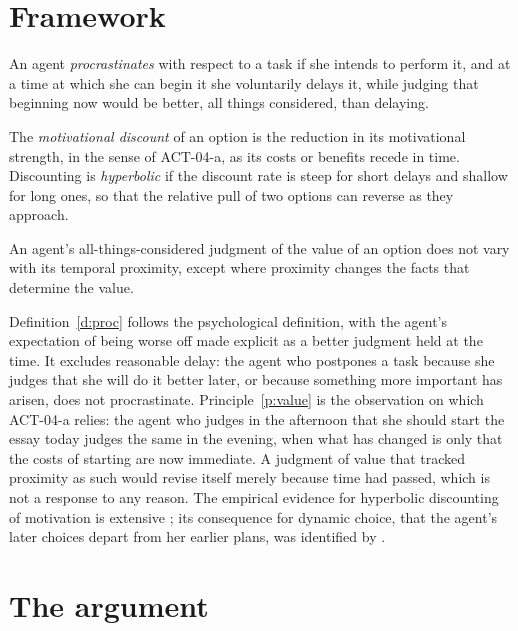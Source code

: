 \documentclass{situationist-preprint}
\begin{document}
\section{Framework}

\begin{definition}[Procrastination]\label{d:proc}
An agent \emph{procrastinates} with respect to a task if she intends to perform it, and at a time at which she can begin it she voluntarily delays it, while judging that beginning now would be better, all things considered, than delaying.
\end{definition}

\begin{definition}[Discounting]\label{d:disc}
The \emph{motivational discount} of an option is the reduction in its motivational strength, in the sense of ACT-04-a, as its costs or benefits recede in time. Discounting is \emph{hyperbolic} if the discount rate is steep for short delays and shallow for long ones, so that the relative pull of two options can reverse as they approach.
\end{definition}

\begin{principle}\label{p:value}
An agent's all-things-considered judgment of the value of an option does not vary with its temporal proximity, except where proximity changes the facts that determine the value.
\end{principle}

Definition~\ref{d:proc} follows the psychological definition, with the agent's expectation of being worse off made explicit as a better judgment held at the time. It excludes reasonable delay: the agent who postpones a task because she judges that she will do it better later, or because something more important has arisen, does not procrastinate. Principle~\ref{p:value} is the observation on which ACT-04-a relies: the agent who judges in the afternoon that she should start the essay today judges the same in the evening, when what has changed is only that the costs of starting are now immediate. A judgment of value that tracked proximity as such would revise itself merely because time had passed, which is not a response to any reason. The empirical evidence for hyperbolic discounting of motivation is extensive \citep{Ainslie1992}; its consequence for dynamic choice, that the agent's later choices depart from her earlier plans, was identified by \citet{Strotz1955}.

\section{The argument}
\end{document}
